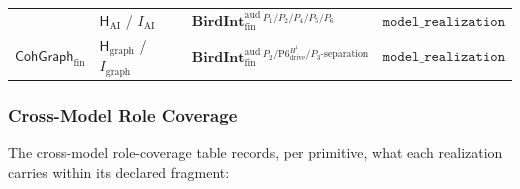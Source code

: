 \documentclass[11pt]{article}
\theoremstyle{definition}
\begin{document}
\begin{longtable}[]{@{}llll@{}}
\begin{minipage}[t]{0.14\columnwidth}
\end{minipage} & \begin{minipage}[t]{0.22\columnwidth}\raggedright
\(\mathsf H_{\mathrm{AI}}\) / \(I_{\mathrm{AI}}\)\strut
\end{minipage} & \begin{minipage}[t]{0.42\columnwidth}\raggedright
\(\mathbf{BirdInt}^{\mathrm{aud}}_{\mathrm{fin}}{}^{\,P_{1}/P_{2}/P_{4}/P_{5}/P_{6}}\)\strut
\end{minipage} & \begin{minipage}[t]{0.11\columnwidth}\raggedright
\(\texttt{model\_realization}\)\strut
\end{minipage}\tabularnewline
\begin{minipage}[t]{0.14\columnwidth}\raggedright
\(\mathsf{CohGraph}_{\mathrm{fin}}\)\strut
\end{minipage} & \begin{minipage}[t]{0.22\columnwidth}\raggedright
\(\mathsf H_{\mathrm{graph}}\) / \(I_{\mathrm{graph}}\)\strut
\end{minipage} & \begin{minipage}[t]{0.42\columnwidth}\raggedright
\(\mathbf{BirdInt}^{\mathrm{aud}}_{\mathrm{fin}}{}^{\,P_{2}/\mathrm{P6}_{\mathrm{drive}}^{H^{1}}/P_{3}\text{-separation}}\)\strut
\end{minipage} & \begin{minipage}[t]{0.11\columnwidth}\raggedright
\(\texttt{model\_realization}\)\strut
\end{minipage}\tabularnewline
\bottomrule
\end{longtable}

\subsubsection{Cross-Model Role Coverage}

The cross-model role-coverage table records, per primitive, what each realization carries within its declared fragment:
\end{document}
